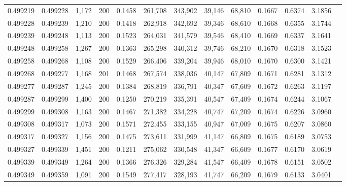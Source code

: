 \begin{tabular}{rrrrrrrrrrrrr}
0.499219 & 0.499228 & 1,172 & 200 &                                     0.1458 & 261,708 & 343,902 &  39,146 &  68,810 & 0.1667 & 0.6374 & 3.1856 \\
0.499228 & 0.499239 & 1,210 & 200 &                                     0.1418 & 262,918 & 342,692 &  39,346 &  68,610 & 0.1668 & 0.6355 & 3.1744 \\
0.499239 & 0.499248 & 1,113 & 200 &                                     0.1523 & 264,031 & 341,579 &  39,546 &  68,410 & 0.1669 & 0.6337 & 3.1641 \\
0.499248 & 0.499258 & 1,267 & 200 &                                     0.1363 & 265,298 & 340,312 &  39,746 &  68,210 & 0.1670 & 0.6318 & 3.1523 \\
0.499258 & 0.499268 & 1,108 & 200 &                                     0.1529 & 266,406 & 339,204 &  39,946 &  68,010 & 0.1670 & 0.6300 & 3.1421 \\
0.499268 & 0.499277 & 1,168 & 201 &                                     0.1468 & 267,574 & 338,036 &  40,147 &  67,809 & 0.1671 & 0.6281 & 3.1312 \\
0.499277 & 0.499287 & 1,245 & 200 &                                     0.1384 & 268,819 & 336,791 &  40,347 &  67,609 & 0.1672 & 0.6263 & 3.1197 \\
0.499287 & 0.499299 & 1,400 & 200 &                                     0.1250 & 270,219 & 335,391 &  40,547 &  67,409 & 0.1674 & 0.6244 & 3.1067 \\
0.499299 & 0.499308 & 1,163 & 200 &                                     0.1467 & 271,382 & 334,228 &  40,747 &  67,209 & 0.1674 & 0.6226 & 3.0960 \\
0.499308 & 0.499317 & 1,073 & 200 &                                     0.1571 & 272,455 & 333,155 &  40,947 &  67,009 & 0.1675 & 0.6207 & 3.0860 \\
0.499317 & 0.499327 & 1,156 & 200 &                                     0.1475 & 273,611 & 331,999 &  41,147 &  66,809 & 0.1675 & 0.6189 & 3.0753 \\
0.499327 & 0.499339 & 1,451 & 200 &                                     0.1211 & 275,062 & 330,548 &  41,347 &  66,609 & 0.1677 & 0.6170 & 3.0619 \\
0.499339 & 0.499349 & 1,264 & 200 &                                     0.1366 & 276,326 & 329,284 &  41,547 &  66,409 & 0.1678 & 0.6151 & 3.0502 \\
0.499349 & 0.499359 & 1,091 & 200 &                                     0.1549 & 277,417 & 328,193 &  41,747 &  66,209 & 0.1679 & 0.6133 & 3.0401 \\

\end{tabular}
